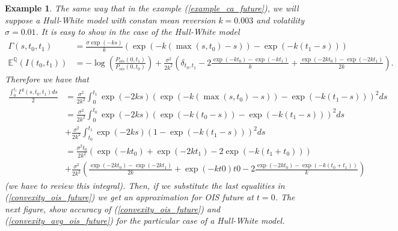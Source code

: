 \documentclass[a4paper,10pt]{article}
\newtheorem{example}[theorem]{Example}
\newcommand{\1}{\mathbf{1}}
\begin{document}
\begin{example}\label{example_convexity_hw_ois}
The same way that in the example (\ref{example_ca_future}), we will suppose a Hull-White model with constan mean reversion $k=0.003$ and volatility $\sigma=0.01$. It is easy to show in the case of the Hull-White model
\begin{align*}
\Gamma(s,t_0,t_1) &= \frac{\sigma \exp(-ks)}{k}\left(\exp(-k(\max(s,t_0) - s)) - \exp(-k(t_1-s))\right)\\
\mathbb{E}^{\mathbb{Q}}\left(I(t_0,t_1)\right)&=-\log\left(\frac{P_{ois}(0,t_1)}{P_{ois}(0,t_0)}\right) + \frac{\sigma^{2}}{2k^{2}}\left(\delta_{t_0,t_1} - 2 \frac{\exp(-kt_0) - \exp(-kt_1)}{k} + \frac{\exp(-2kt_0) - \exp(-2kt_1)}{2k}  \right).
\end{align*}
Therefore we have that
\begin{align*}
\frac{\int_{0}^{t_1} \Gamma^{2}(s,t_0,t_1) ds}{2} &= \frac{\sigma^{2}}{2k^2} \int_{0}^{t_1}  \exp(-2ks)\left(\exp(-k(\max(s,t_0) - s)) - \exp(-k(t_1 - s))\right)^{2} ds \\
&= \frac{\sigma^{2}}{2k^2} \int_{0}^{t_0} \exp(-2ks)\left(\exp(-k(t_0 - s)) - \exp(-k(t_1 - s))\right)^{2} ds\\
&+ \frac{\sigma^{2}}{2k^2} \int_{t_0}^{t_1} \exp(-2ks)\left(1 - \exp(-k(t_1 - s))\right)^{2} ds\\
&= \frac{\sigma^{2}t_0}{2k^{2}} \left( \exp(-kt_0) + \exp(-2kt_1) - 2 \exp(-k(t_1+t_0)) \right)\\  
&+ \frac{\sigma^{2}}{2k^{2}} \left(\frac{\exp(-2kt_0) - \exp(-2kt_1)}{2k}  + \exp(-kt0)t0 - 2 \frac{\exp(-2kt_0) - \exp(-k(t_0 + t_1))}{k}  \right)
\end{align*}(we have to review this integral).
Then, if we substitute the last equalities in (\ref{convexity_ois_future}) we get an approximation for OIS future at $t=0$. The next figure, show accuracy of (\ref{convexity_ois_future}) and (\ref{convexity_avg_ois_future}) for the particular case of a Hull-White model.



\end{example}
\end{document}
